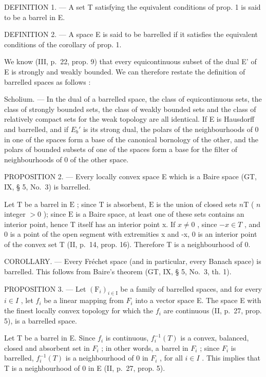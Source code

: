 DEFINITION 1. --- A set T satisfying the equivalent conditions of prop. 1 is said to be a barrel in E.

DEFINITION 2. --- A space E is said to be barrelled if it satisfies the equivalent conditions of the corollary of prop. 1.

We know (III, p.~22, prop. 9) that every equicontinuous subset of the dual E' of E is strongly and weakly bounded. We can therefore restate the definition of barrelled spaces as follows :

Scholium. --- In the dual of a barrelled space, the class of equicontinuous sets, the class of strongly bounded sets, the class of weakly bounded sets and the class of relatively compact sets for the weak topology are all identical. If E is Hausdorff and barrelled, and if \(E_{b}'\) is its strong dual, the polars of the neighbourhoods of 0 in one of the spaces form a base of the canonical bornology of the other, and the polars of bounded subsets of one of the spaces form a base for the filter of neighbourhoods of 0 of the other space.

PROPOSITION 2. --- Every locally convex space E which is a Baire space (GT, IX, § 5, No.~3) is barrelled.

Let \(\mathrm{T}\) be a barrel in \(\mathrm{E}\) ; since \(\mathrm{T}\) is absorbent, \(\mathrm{E}\) is the union of closed sets \(n\mathrm{T}\) ( \(n\) integer \(> 0\) ); since \(\mathrm{E}\) is a Baire space, at least one of these sets contains an interior point, hence T itself has an interior point x. If \(x \neq 0\) , since \(-x \in T\) , and 0 is a point of the open segment with extremities x and -x, 0 is an interior point of the convex set T (II, p.~14, prop. 16). Therefore T is a neighbourhood of 0.

COROLLARY. --- Every Fréchet space (and in particular, every Banach space) is barrelled. This follows from Baire's theorem (GT, IX, § 5, No.~3, th. 1).

PROPOSITION 3. --- Let \((\mathrm{F}_{i})_{i\in\mathrm{I}}\) be a family of barrelled spaces, and for every \(i\in I\) , let \(f_{i}\) be a linear mapping from \(F_{i}\) into a vector space E. The space E with the finest locally convex topology for which the \(f_{i}\) are continuous (II, p.~27, prop. 5), is a barrelled space.

Let T be a barrel in E. Since \(f_{i}\) is continuous, \(f_{i}^{-1}(T)\) is a convex, balanced, closed and absorbent set in \(F_{i}\) ; in other words, a barrel in \(F_{i}\) ; since \(F_{i}\) is barrelled, \(f_{i}^{-1}(T)\) is a neighbourhood of 0 in \(F_{i}\) , for all \(i \in I\) . This implies that T is a neighbourhood of 0 in E (II, p.~27, prop. 5).

